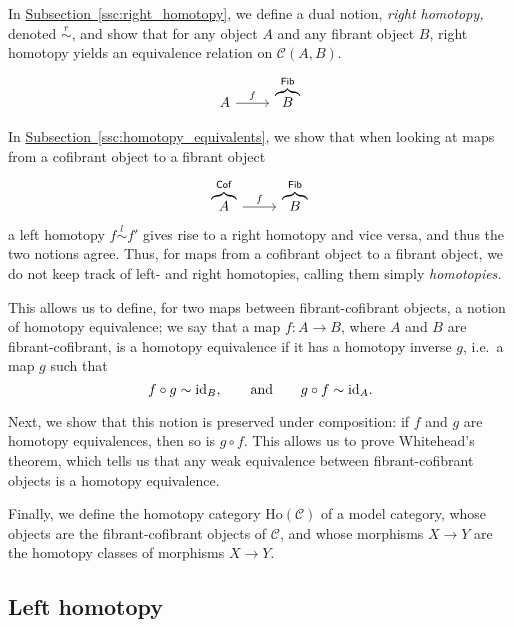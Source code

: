 \documentclass[main.tex]{subfiles}
\begin{document}
In \hyperref[ssc:right_homotopy]{Subsection~\ref*{ssc:right_homotopy}}, we define a dual notion, \emph{right homotopy,} denoted $\overset{r}{\sim}$, and show that for any object $A$ and any fibrant object $B$, right homotopy yields an equivalence relation on $\mathcal{C}(A, B)$.
\begin{equation*}
  \begin{tikzcd}
    A
    \arrow[r, "f"]
    & \overbrace{B}^{\fib}
  \end{tikzcd}
\end{equation*}

In \hyperref[ssc:homotopy_equivalents]{Subsection~\ref*{ssc:homotopy_equivalents}}, we show that when looking at maps from a cofibrant object to a fibrant object
\begin{equation*}
  \begin{tikzcd}
    \overbrace{A}^{\cof}
    \arrow[r, "f"]
    & \overbrace{B}^{\fib}
  \end{tikzcd}
\end{equation*}
a left homotopy $f \overset{l}{\sim} f'$ gives rise to a right homotopy and vice versa, and thus the two notions agree. Thus, for maps from a cofibrant object to a fibrant object, we do not keep track of left- and right homotopies, calling them simply \emph{homotopies.}

This allows us to define, for two maps between fibrant-cofibrant objects, a notion of homotopy equivalence; we say that a map $f\colon A \to B$, where $A$ and $B$ are fibrant-cofibrant, is a homotopy equivalence if it has a homotopy inverse $g$, i.e.\ a map $g$ such that
\begin{equation*}
  f \circ g \sim \mathrm{id}_{B},\qquad \text{and}\qquad g \circ f \sim \mathrm{id}_{A}.
\end{equation*}

Next, we show that this notion is preserved under composition: if $f$ and $g$ are homotopy equivalences, then so is $g \circ f$. This allows us to prove Whitehead's theorem, which tells us that any weak equivalence between fibrant-cofibrant objects is a homotopy equivalence.

Finally, we define the homotopy category $\mathrm{Ho}(\mathcal{C})$ of a model category, whose objects are the fibrant-cofibrant objects of $\mathcal{C}$, and whose morphisms $X \to Y$ are the homotopy classes of morphisms $X \to Y$.

\subsection{Left homotopy}
\label{ssc:left_homotopy}
\end{document}
